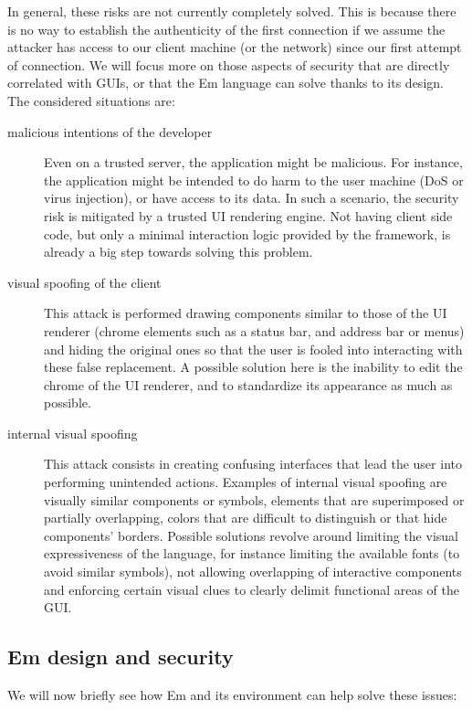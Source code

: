 In general, these risks are not currently completely solved. This is because there is no way to establish the authenticity of the first connection if we assume the attacker has access to our client machine (or the network) since our first attempt of connection. We will focus more on those aspects of security that are directly correlated with GUIs, or that the Em language can solve thanks to its design. The considered situations are:

\begin{description}
  \item[malicious intentions of the developer] Even on a trusted server, the application might be malicious. For instance, the application might be intended to do harm to the user machine (DoS or virus injection), or have access to its data. In such a scenario, the security risk is mitigated by a trusted UI rendering engine. Not having client side code, but only a minimal interaction logic provided by the framework, is already a big step towards solving this problem.
  \item[visual spoofing of the client] This attack is performed drawing components similar to those of the UI renderer (chrome elements such as a status bar, and address bar or menus) and hiding the original ones so that the user is fooled into interacting with these false replacement. A possible solution here is the inability to edit the chrome of the UI renderer, and to standardize its appearance as much as possible.
  \item[internal visual spoofing] This attack consists in creating confusing interfaces that lead the user into performing unintended actions. Examples of internal visual spoofing are visually similar components or symbols, elements that are superimposed or partially overlapping, colors that are difficult to distinguish or that hide components' borders. Possible solutions revolve around limiting the visual expressiveness of the language, for instance limiting the available fonts (to avoid similar symbols), not allowing overlapping of interactive components and enforcing certain visual clues to clearly delimit functional areas of the GUI.
\end{description}

\subsection{Em design and security}

We will now briefly see how Em and its environment can help solve these issues:

